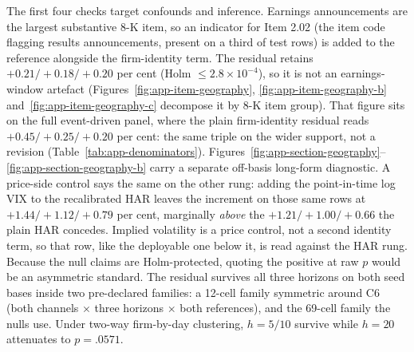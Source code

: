 The first four checks target confounds and inference. Earnings announcements are the largest substantive 8-K item, so an indicator for Item 2.02 (the item code flagging results announcements, present on a third of test rows) is added to the reference alongside the firm-identity term. The residual retains $+0.21/+0.18/+0.20$ per cent (Holm $\le 2.8\times10^{-4}$), so it is not an earnings-window artefact (Figures~\ref{fig:app-item-geography}, \ref{fig:app-item-geography-b} and~\ref{fig:app-item-geography-c} decompose it by 8-K item group). %
That figure sits on the full event-driven panel, where the plain firm-identity residual reads $+0.45/+0.25/+0.20$ per cent: the same triple on the wider support, not a revision (Table~\ref{tab:app-denominators}). %
Figures~\ref{fig:app-section-geography}--\ref{fig:app-section-geography-b} carry a separate off-basis long-form diagnostic.
A price-side control says the same on the other rung: adding the point-in-time log VIX to the recalibrated HAR leaves the increment on those same rows at $+1.44/+1.12/+0.79$ per cent, marginally \emph{above} the $+1.21/+1.00/+0.66$ the plain HAR concedes. Implied volatility is a price control, not a second identity term, so that row, like the deployable one below it, is read against the HAR rung. %
Because the null claims are Holm-protected, quoting the positive at raw $p$ would be an asymmetric standard. The residual survives all three horizons on both seed bases inside two pre-declared families: a 12-cell family symmetric around C6 (both channels $\times$ three horizons $\times$ both references), and the 69-cell family the nulls use. %
Under two-way firm-by-day clustering, $h{=}5/10$ survive while $h{=}20$ attenuates to $p=.0571$. %

